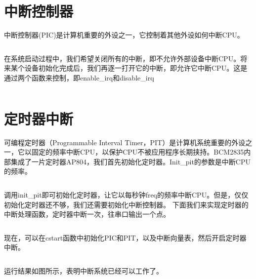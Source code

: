 \documentclass[main.tex]{subfiles}
\begin{document}
\begin{CJK*}{UTF8}{song}
\section{中断控制器}
中断控制器(PIC)是计算机重要的外设之一，它控制着其他外设如何中断CPU。
\inputminted[firstline=42,lastline=51,linenos,numbersep=5pt,frame=lines,framesep=2mm]{c}{chapter03/kernel/machdep.c}
在系统启动过程中，我们希望关闭所有的中断，即不允许外部设备中断CPU。将来某个设备初始化完成后，我们再逐一打开它的中断，即允许它中断CPU。这是通过两个函数来控制，即enable\_irq和disable\_irq
\inputminted[firstline=53,lastline=81,linenos,numbersep=5pt,frame=lines,framesep=2mm]{c}{chapter03/kernel/machdep.c}

\section{定时器中断}
可编程定时器（Programmable Interval Timer，PIT）是计算机系统重要的外设之一，它以固定的频率中断CPU，以保护CPU不被应用程序长期挟持。BCM2835内部集成了一片定时器AP804，我们首先初始化定时器。Init\_pit的参数是中断CPU的频率。
\inputminted[firstline=119,lastline=133,linenos,numbersep=5pt,frame=lines,framesep=2mm]{c}{chapter03/kernel/machdep.c}
调用init\_pit即可初始化定时器，让它以每秒钟freq的频率中断CPU。但是，仅仅初始化定时器还不够，我们还需要初始化中断控制器。
下面我们来实现定时器的中断处理函数，定时器中断一次，往串口输出一个点。

\inputminted[firstline=3,lastline=23,linenos,numbersep=5pt,frame=lines,framesep=2mm]{c}{chapter03/kernel/kernel.c}

现在，可以在cstart函数中初始化PIC和PIT，以及中断向量表，然后开启定时器中断。

\inputminted[firstline=135,lastline=164,linenos,numbersep=5pt,frame=lines,framesep=2mm]{c}{chapter03/kernel/machdep.c}
运行结果如图所示，表明中断系统已经可以工作了。

\clearpage
\end{CJK*}
\end{document}
